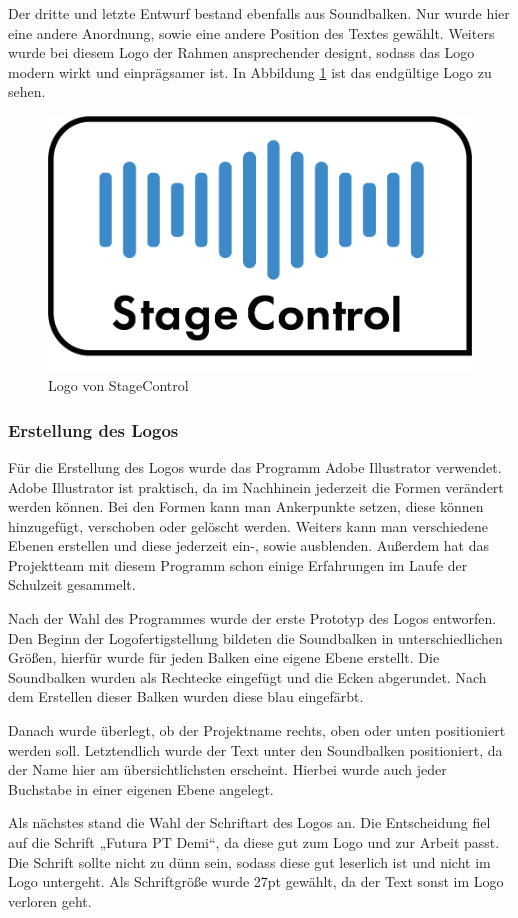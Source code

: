 Der dritte und letzte Entwurf bestand ebenfalls aus Soundbalken. Nur wurde hier eine andere Anordnung, sowie eine andere Position des Textes gewählt. Weiters wurde bei diesem Logo der Rahmen ansprechender designt, sodass das Logo modern wirkt und einprägsamer ist. In Abbildung \ref{fig:Logo StageControl} ist das endgültige Logo zu sehen.

\begin{figure}[H]
	\centering
	\includegraphics[width=0.5\linewidth]{images/Logo StageControl.png}
	\caption[Logo von StageControl]{Logo von StageControl}
	\label{fig:Logo StageControl}
\end{figure}

\newpage
\subsubsection{Erstellung des Logos}
Für die Erstellung des Logos wurde das Programm Adobe Illustrator verwendet. Adobe Illustrator ist praktisch, da im Nachhinein jederzeit die Formen verändert werden können. Bei den Formen kann man Ankerpunkte setzen, diese können hinzugefügt, verschoben oder gelöscht werden. Weiters kann man verschiedene Ebenen erstellen und diese jederzeit ein-, sowie ausblenden. Außerdem hat das Projektteam mit diesem Programm schon einige Erfahrungen im Laufe der Schulzeit gesammelt. 

Nach der Wahl des Programmes wurde der erste Prototyp des Logos entworfen. Den Beginn der Logofertigstellung bildeten die Soundbalken in unterschiedlichen Größen, hierfür wurde für jeden Balken eine eigene Ebene erstellt. Die Soundbalken wurden als Rechtecke eingefügt und die Ecken abgerundet. Nach dem Erstellen dieser Balken wurden diese blau eingefärbt. 

Danach wurde überlegt, ob der Projektname rechts, oben oder unten positioniert werden soll. Letztendlich wurde der Text unter den Soundbalken positioniert, da der Name hier am übersichtlichsten erscheint. Hierbei wurde auch jeder Buchstabe in einer eigenen Ebene angelegt. 

Als nächstes stand die Wahl der Schriftart des Logos an. Die Entscheidung fiel auf die Schrift „Futura PT Demi“, da diese gut zum Logo und zur Arbeit passt. Die Schrift sollte nicht zu dünn sein, sodass diese gut leserlich ist und nicht im Logo untergeht. Als Schriftgröße wurde 27pt gewählt, da der Text sonst im Logo verloren geht. 

